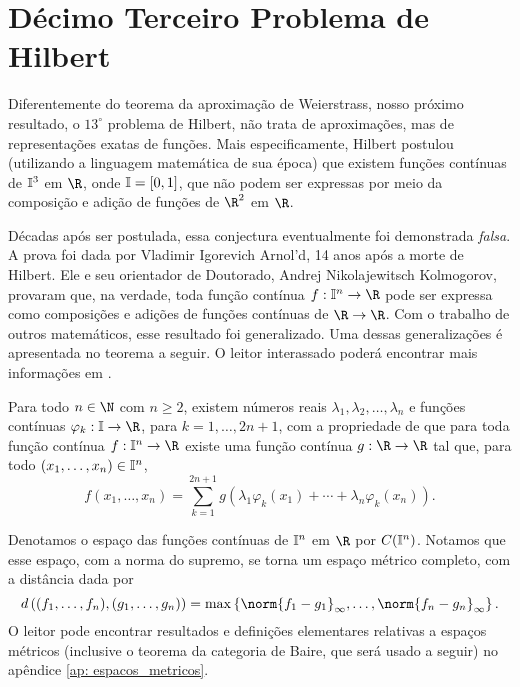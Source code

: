 \section{Décimo Terceiro Problema de Hilbert}

Diferentemente do teorema da aproximação de Weierstrass, nosso próximo resultado, o \( 13^{ \circ } \) problema de Hilbert, não trata de aproximações, mas de representações exatas de funções.
Mais especificamente, Hilbert postulou (utilizando a linguagem matemática de sua época) que existem funções contínuas de \( \mathbb{I}^{ 3 } \) em \( \R \), onde \( \mathbb{I} = [0, 1] \), que não podem ser expressas por meio da composição e adição de funções de \( \R^{ 2 } \) em \( \R \).

Décadas após ser postulada, essa conjectura eventualmente foi demonstrada \emph{falsa}.
A prova foi dada por Vladimir Igorevich Arnol'd, 14 anos após a morte de Hilbert.
Ele e seu orientador de Doutorado, Andrej Nikolajewitsch Kolmogorov, provaram que, na verdade, toda função contínua \( f : \I^{ n } \to \R \) pode ser expressa como composições e adições de funções contínuas de \( \R \to \R \).
Com o trabalho de outros matemáticos, esse resultado foi generalizado.
Uma dessas generalizações é apresentada no teorema a seguir.
O leitor interassado poderá encontrar mais informações em \cite{hilbert}.
\begin{teo}
    Para todo \( n \in \N \) com \( n \geq 2 \), existem números reais \( \lambda_{ 1 }, \lambda_{ 2 }, \dots, \lambda_{ n } \) e funções contínuas \( \varphi_{ k } : \I \to \R \), para \( k = 1, \dots, 2n + 1 \), com a propriedade de que para toda função contínua \( f : \I^{ n } \to \R \) existe uma função contínua \( g : \R \to \R \) tal que, para todo \( ( x_{ 1 }, \dots, x_{ n } ) \in \mathbb{I}^{ n } \),
    \begin{equation}
        f(x_{ 1 }, \dots, x_{ n }) =
        \sum_{ k=1 }^{ 2n+1 } g ( \lambda_{ 1 } \varphi_{ k } ( x_{ 1 } )  + \cdots + \lambda_{ n } \varphi_{ k } ( x_{ n } ) )
        \label{eq: kolmogorov_2}
    .\end{equation}
\end{teo}
\begin{rem}
    Denotamos o espaço das funções contínuas de \( \mathbb{I}^{ n } \) em \( \R \) por \( C(\mathbb{I}^{ n }) \).
    Notamos que esse espaço, com a norma do supremo, se torna um espaço métrico completo, com a distância dada por
    \begin{equation}
        d \left( 
            ( f_{ 1 }, \dots, f_{ n } ),
            ( g_{ 1 }, \dots, g_{ n } )
        \right)
        = \max \left\{ 
            \norm{ f_{ 1 } - g_{ 1 } }_{ \infty },
            \dots,
            \norm{ f_{ n } - g_{ n } }_{ \infty }
        \right\}
    .\end{equation}
    O leitor pode encontrar resultados e definições elementares relativas a espaços métricos (inclusive o teorema da categoria de Baire, que será usado a seguir) no apêndice \ref{ap: espacos_metricos}.
\end{rem}
